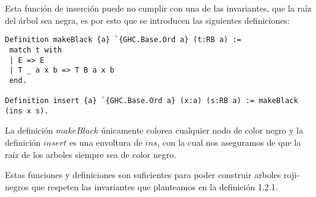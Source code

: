 \documentclass[letterpaper,12pt,oneside]{book}
\newcommand{\arns}{arboles roji-negros}
\theoremstyle{plain}
\theoremstyle{definition}
\theoremstyle{remark}
\begin{document}
Esta función de inserción puede no cumplir con una de las invariantes, que la raíz del árbol sea negra, 
es por esto que se introducen las siguientes definiciones:

\begin{verbatim}
Definition makeBlack {a} `{GHC.Base.Ord a} (t:RB a) :=
 match t with
 | E => E
 | T _ a x b => T B a x b
 end.

Definition insert {a} `{GHC.Base.Ord a} (x:a) (s:RB a) := makeBlack (ins x s).
\end{verbatim}

La definici\'on $makeBlack$ únicamente colorea cualquier nodo de color negro y la definición $insert$ es 
una envoltura de $ins$, con la cual nos aseguramos de que la ra\'iz de los arboles siempre sea de color 
negro.

Estas funciones y definiciones son suficientes para poder construir {\arns} que respeten las invariantes 
que planteamos en la definici\'on 1.2.1. 
\end{document}
